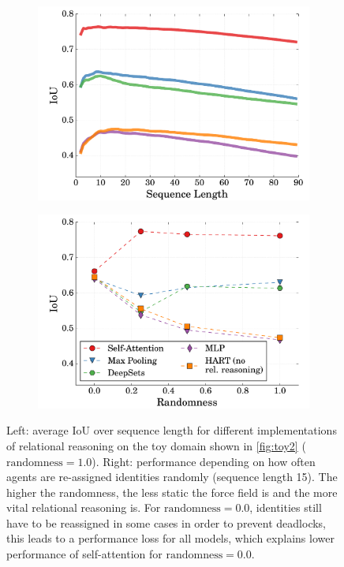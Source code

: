 \begin{figure}
    \centering
    \begin{subfigure}[c]{0.49\linewidth}
        \centering
        \includegraphics[width=\linewidth]{figures/MOHART/toy_iou_over_timesteps.pdf}
    \end{subfigure}
    \begin{subfigure}[c]{0.49\linewidth}
        \centering
        \includegraphics[width=\linewidth]{figures/MOHART/dial.pdf}
    \end{subfigure}
    \vspace{-2mm}
    \caption{
        Left: average IoU over sequence length for different implementations of relational reasoning on the toy domain shown in \cref{fig:toy2} ($\text{randomness} = 1.0$). Right: performance depending on how often agents are re-assigned identities randomly (sequence length 15). The higher the randomness, the less static the force field is and the more vital relational reasoning is. For $\text{randomness} = 0.0$, identities still have to be reassigned in some cases in order to prevent deadlocks, this leads to a performance loss for all models, which explains lower performance of self-attention for $\text{randomness} = 0.0$.
        \vspace{-4mm}
    }
    \label{fig:toy_quant}
\end{figure}

